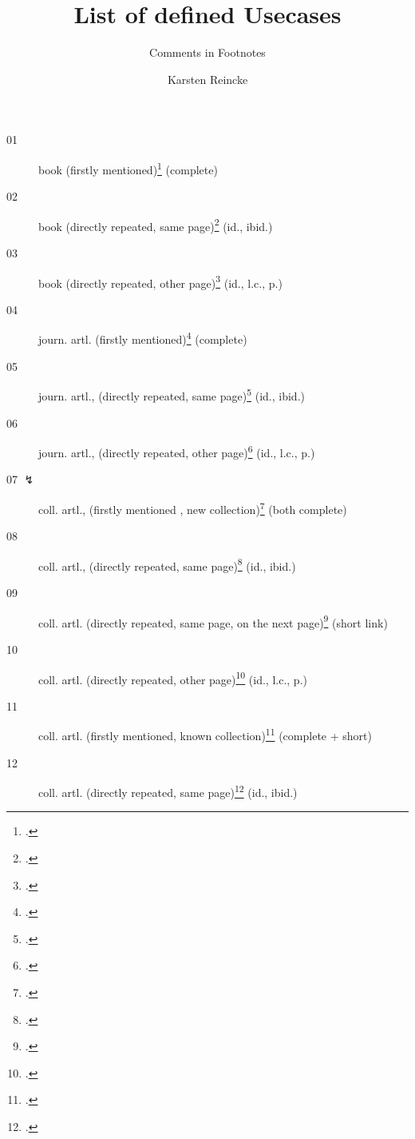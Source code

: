 \documentclass[
  DIV=calc,
  BCOR=5mm,
  11pt,
  smallheadings,
  oneside,
  abstract=true,
  toc=bib,
  ngerman,english]{scrartcl}
\begin{document}
\nocite{*}

\titlehead{mycsrf.verify-: English}
\subject{(scholar-) Scientific Texts Based on a Modified \textit{jurabib}}
\title{List of defined Usecases}
\subtitle{Comments in Footnotes}
\author{Karsten Reincke}

\maketitle


\begin{description}

  \item[01 \checkmark] book 
    (firstly  mentioned)\footcite[cf.][12]{KantKdU1974} (complete) 
  \item[02 \checkmark] book (directly repeated,
      same page)\footcite[cf.][12]{KantKdU1974} (id., ibid.)
  \item[03 \checkmark] book (directly repeated, 
      other page)\footcite[cf.][13]{KantKdU1974} (id., l.c., p.)
  \item[04 \checkmark] journ. artl.
    (firstly  mentioned)\footcite[cf.][12]{McCarthy1980a} (complete)
  \item[05 \checkmark] journ. artl., (directly repeated,
       same page)\footcite[cf.][12]{McCarthy1980a} (id., ibid.)
  \item[06 \checkmark] journ. artl., (directly repeated,
       other page)\footcite[cf.][13]{McCarthy1980a} (id., l.c., p.)
  
  \item[07 $\lightning$] coll. artl., (firstly  mentioned , 
      new collection)\footcite[cf.][12]{Hays1985a} (both complete)
  \item[08 \checkmark] coll. artl., (directly repeated,
      same page)\footcite[cf.][12]{Hays1985a} (id., ibid.)
      
 \item[09 \checkmark] coll. artl. (directly repeated,
      same page, on the next page)\footcite[cf.][12]{Hays1985a} (short link)
  \item[10 \checkmark]  coll. artl. (directly repeated,
      other page)\footcite[cf.][13]{Hays1985a} (id., l.c., p.)
       
  \item[11 \checkmark] coll. artl. (firstly  mentioned,
      known collection)\footcite[cf.][12]{DaBu1985a} (complete + short)
  \item[12 \checkmark] coll. artl. (directly repeated,
      same page)\footcite[cf.][12]{DaBu1985a} (id., ibid.)


\end{description}
\end{document}
